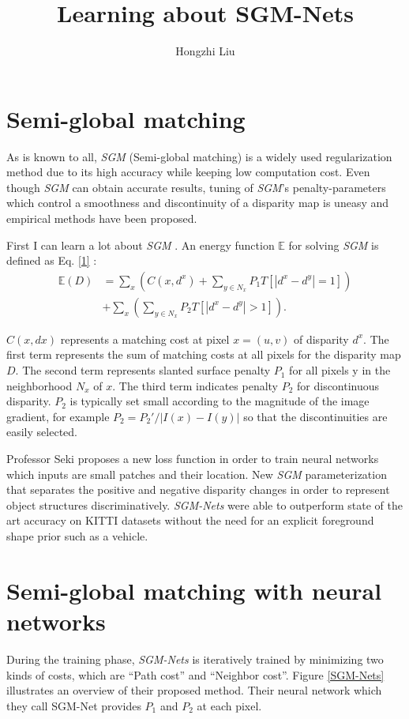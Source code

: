 \documentclass[twocolumn]{article}
\author{Hongzhi Liu}
\title{Learning about SGM-Nets}
\begin{document}
	\maketitle
	\par
	\section{Semi-global matching}
	As is known to all, \emph{SGM} (Semi-global matching) is a widely used regularization method due to its high accuracy while keeping low computation cost. Even though \emph{SGM} can obtain accurate results, tuning of \emph{SGM}’s penalty-parameters which control a smoothness and discontinuity of a disparity map is uneasy and empirical methods have been proposed.
	
	First I can learn a lot about \emph{SGM} \cite{Hirschmuller2007Stereo}. An energy function $\mathbb{E}$ for solving \emph{SGM} is defined as Eq. \ref{1} :
	\begin{equation}
	\begin{split}
	\mathbb{E}(D) &=\sum_x \left( C(x,d^x) +\sum_{y\in N_x}P_1 T \left[ \left| d^x-d^y \right|=1 \right] \right)  \\
	&+\sum_x \left( \sum_{y\in N_x} P_2 T \left[ \left| d^x-d^y \right|>1 \right] \right).
	\end{split} \label{1}
	\end{equation}
	
	$C(x, dx)$ represents a matching cost at pixel $x = (u, v)$ of disparity $d^x$. The first term represents the sum of matching costs at all pixels for the disparity map $D$. The second term represents slanted surface penalty $P_1$ for all pixels y in the neighborhood $N_x$ of $x$. The third term indicates penalty $P_2$ for discontinuous disparity. $P_2$ is typically set small according to the magnitude of the image gradient, for example $P_2 = P_2'/\left|I(x)-I(y)\right| $ so that the discontinuities are easily selected.
	
	Professor Seki proposes a new loss function in order to train neural networks which inputs are small patches and their location. New \emph{SGM} parameterization that separates the positive and negative disparity changes in order to represent object structures discriminatively. \emph{SGM-Nets} were able to outperform state of the art accuracy on KITTI datasets without the need for an explicit foreground shape prior such as a vehicle.
	
    \section{Semi-global matching with neural networks}
	During the training phase, \emph{SGM-Nets} is iteratively trained by minimizing two kinds of costs, which are ``Path cost'' and ``Neighbor cost''. Figure \ref{SGM-Nets} illustrates an overview of their proposed method. Their neural network which they call SGM-Net provides $P_1$ and $P_2$ at each pixel.
	
\end{document}
